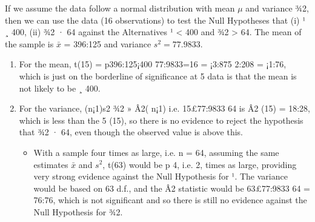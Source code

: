 \documentclass[a4paper,12pt]{article}
\begin{document}
If we assume the data follow a normal distribution with mean $\mu$ and variance ¾2,
then we can use the data (16 observations) to test the Null Hypotheses that
(i) ¹ ¸ 400, (ii) ¾2 · 64 against the Alternatives ¹ < 400 and ¾2 > 64.
The mean of the sample is $\bar{x}$ = 396:125 and variance $s^2 = 77.9833$.


\begin{enumerate}
    \item For the mean, t(15) = p396:125¡400
77:9833=16
= ¡3:875
2:208 = ¡1:76, which is just on the
borderline of significance at 5%
data is that the mean is not likely to be ¸ 400.
\item For the variance, (n¡1)s2
¾2 » Â2(
n¡1) i.e. 15£77:9833
64 is Â2
(15) = 18:28, which is
less than the 5%
(15), so there is no evidence to reject the
hypothesis that ¾2 · 64, even though the observed value is above this.
\begin{itemize}
\item With a sample four times as large, i.e. n = 64, assuming the same estimates
$\bar{x}$ and $s^2$, t(63) would be
p
4, i.e. 2, times as large, providing very strong
evidence against the Null Hypothesis for ¹. The variance would be based
on 63 d.f., and the Â2 statistic would be 63£77:9833
64 = 76:76, which is not
significant and so there is still no evidence against the Null Hypothesis for
¾2.
\end{itemize}
\end{enumerate}
\end{document}
